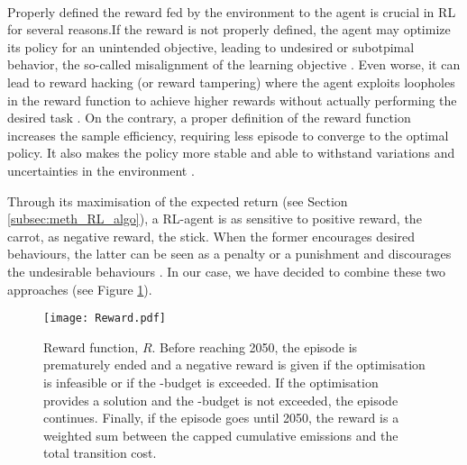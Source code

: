 \\

\noindent
Properly defined the reward fed by the environment to the agent is crucial in \gls{RL} for several reasons.If the reward is not properly defined, the agent may optimize its policy for an unintended objective, leading to undesired or subotpimal behavior, \ie the so-called misalignment of the learning objective \cite{christiano2017deep}. Even worse, it can lead to reward hacking (or reward tampering) where the agent exploits loopholes in the reward function to achieve higher rewards without actually performing the desired task \cite{amodei2016concrete}. On the contrary, a proper definition of the reward function increases the sample efficiency, \ie requiring less episode to converge to the optimal policy.  It also makes the policy more stable and able to withstand variations and uncertainties in the environment \cite{henderson2018deep}.

Through its maximisation of the expected return (see Section \ref{subsec:meth_RL_algo}), a \gls{RL}-agent is as sensitive to positive reward, \ie the carrot, as negative reward, \ie the stick.  When the former encourages desired behaviours, the latter can be seen as a penalty or a punishment and discourages the undesirable behaviours \cite{sutton2018reinforcement}. In our case, we have decided to combine these two approaches (see Figure \ref{fig:Reward}).

\begin{figure}[!htbp]
\centering
\texttt{[image: Reward.pdf]}
\caption{Reward function, $R$. Before reaching 2050, the episode is prematurely ended and a negative reward is given if the optimisation is infeasible or if the -budget is exceeded. If the optimisation provides a solution and the -budget is not exceeded, the episode continues. Finally, if the episode goes until 2050, the reward is a weighted sum between the capped cumulative emissions and the total transition cost.}
\label{fig:Reward}
\end{figure} 

